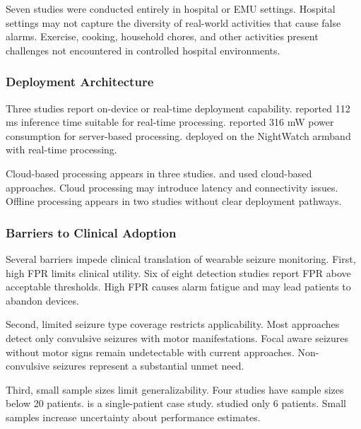 Seven studies were conducted entirely in hospital or EMU settings. Hospital settings may not capture the diversity of real-world activities that cause false alarms. Exercise, cooking, household chores, and other activities present challenges not encountered in controlled hospital environments.

\subsubsection{Deployment Architecture}

Three studies report on-device or real-time deployment capability. \textcite{spahrDeepLearningbasedDetection2025} reported 112 ms inference time suitable for real-time processing. \textcite{borujenyDetectionEpilepticSeizure2013} reported 316 mW power consumption for server-based processing. \textcite{dongTwoLayerEnsembleMethod2022} deployed on the NightWatch armband with real-time processing.

Cloud-based processing appears in three studies. \textcite{nasseriAmbulatorySeizureForecasting2021} and \textcite{odeDevelopmentEpilepticSeizure2023} used cloud-based approaches. Cloud processing may introduce latency and connectivity issues. Offline processing appears in two studies without clear deployment pathways.

\subsubsection{Barriers to Clinical Adoption}

Several barriers impede clinical translation of wearable seizure monitoring. First, high FPR limits clinical utility. Six of eight detection studies report FPR above acceptable thresholds. High FPR causes alarm fatigue and may lead patients to abandon devices.

Second, limited seizure type coverage restricts applicability. Most approaches detect only convulsive seizures with motor manifestations. Focal aware seizures without motor signs remain undetectable with current approaches. Non-convulsive seizures represent a substantial unmet need.

Third, small sample sizes limit generalizability. Four studies have sample sizes below 20 patients. \textcite{singhRathoreWearableBasedEpileptic2024} is a single-patient case study. \textcite{nasseriAmbulatorySeizureForecasting2021} studied only 6 patients. Small samples increase uncertainty about performance estimates.

